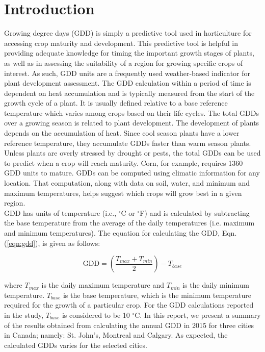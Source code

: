 \documentclass{article}
\begin{document}
\section{ \bf Introduction}
Growing degree days (GDD) is simply a predictive tool used in horticulture for accessing crop maturity and development. This predictive tool is helpful in providing adequate knowledge for timing the important growth stages of plants, as well as in assessing the suitability of a region for growing specific crops of interest. As such, GDD units are a frequently used weather-based indicator for plant development assessment. The GDD calculation within a period of time is dependent on heat accumulation and is typically measured from the start of the growth cycle of a plant. It is usually defined relative to a base reference temperature which varies among crops based on their life cycles. The total GDDs over a growing season is related to plant development. The development of plants depends on the accumulation of heat. Since cool season plants have a lower reference temperature, they accumulate GDDs faster than warm season plants. Unless plants are overly stressed by drought or pests, the total GDDs can be used to predict when a crop will reach maturity. Corn, for example, requires 1360 GDD units to mature. GDDs can be computed using climatic information for any location. That computation, along with data on soil, water, and minimum and maximum temperatures, helps suggest which crops will grow best in a given region.\\ [\baselineskip] GDD has units of temperature (i.e., $^{\circ}$C or $^{\circ}$F) and is calculated by subtracting the base temperature from the average of the daily temperatures (i.e. maximum and minimum temperatures). The equation for calculating the GDD, Eqn.(\ref{eqn:gdd}), is given as follows:

\begin{equation}
\textrm{GDD} = \left(\frac{T_{max} + T_{min}}{2}\right) - T_{base}
\label{eqn:gdd}
\end{equation}

\noindent where {$T_{max}$} is the daily maximum temperature and {$T_{min}$} is the daily minimum temperature. {$T_{base}$} is the base temperature, which is the minimum temperature required for the growth of a particular crop. For the GDD calculations reported in the study, {$T_{base}$} is considered to be 10 $^{\circ}$C.
In this report, we present a summary of the results obtained from calculating the annual GDD in 2015 for three cities in Canada; namely: St. John's, Montreal and Calgary. As expected, the calculated GDDs varies for the selected cities. 
\end{document}

